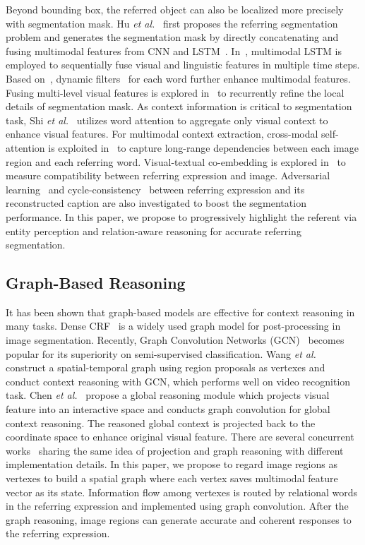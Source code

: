 \documentclass[10pt,twocolumn,letterpaper]{article}
\begin{document}
Beyond bounding box, the referred object can also be localized more precisely with segmentation 
mask. Hu \textit{et al.}~\cite{hu2016segmentation} first proposes the referring segmentation problem and generates 
the segmentation mask by directly concatenating and fusing multimodal features from CNN and 
LSTM~\cite{hochreiter1997long}. In~\cite{liu2017recurrent}, multimodal LSTM is employed to 
sequentially fuse visual and linguistic features in multiple time steps. Based on~\cite{liu2017recurrent}, 
dynamic filters~\cite{margffoy2018dynamic} for each word further enhance multimodal features. 
Fusing multi-level visual features is explored 
in~\cite{li2018referring} to recurrently refine the local details of segmentation mask. As 
context information is critical to segmentation task, Shi \textit{et al.}~\cite{shi2018key} utilizes word 
attention to aggregate only visual context to enhance visual features. 
For multimodal context extraction, cross-modal self-attention is exploited 
in~\cite{ye2019cross} to capture long-range dependencies between each image region and 
each referring word. Visual-textual co-embedding is explored in~\cite{chen2019see} to measure 
compatibility between referring expression and image. 
Adversarial learning~\cite{qiu2019referring} and cycle-consistency~\cite{chen2019referring} 
between referring expression and its reconstructed caption are also investigated to boost 
the segmentation performance. In this paper, we propose to progressively 
highlight the referent via entity perception and relation-aware reasoning for 
accurate referring segmentation.

\subsection{Graph-Based Reasoning}
It has been shown that graph-based models are effective for context reasoning in many tasks. 
Dense CRF~\cite{chandra2017dense} is a widely used graph model for post-processing in image 
segmentation. Recently, Graph Convolution Networks (GCN)~\cite{chandra2017dense} becomes popular 
for its superiority on semi-supervised classification. Wang \textit{et al.}~\cite{wang2018videos} 
construct a spatial-temporal graph using region proposals as vertexes and conduct context reasoning with GCN, 
which performs well on video recognition task. Chen \textit{et al.}~\cite{chen2019graph} propose 
a global reasoning module which projects visual feature into an interactive space and conducts graph 
convolution for global context reasoning. The reasoned global context is projected back to the coordinate space 
to enhance original visual feature. There are several concurrent 
works~\cite{li2018beyond}\cite{liang2018symbolic}\cite{zhang2019latentgnn} sharing the same idea of 
projection and graph reasoning with different implementation details. In this paper, we propose to 
regard image regions as vertexes to build a spatial graph where each vertex saves multimodal feature 
vector as its state. Information flow among vertexes is routed by relational words in the referring 
expression and implemented using graph convolution. After the graph reasoning, image regions can 
generate accurate and coherent responses to the referring expression.
\end{document}
